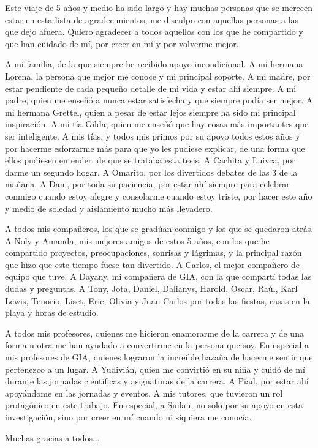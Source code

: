 \begin{acknowledgements}

Este viaje de 5 años y medio ha sido largo y hay muchas personas que se merecen estar en esta lista de agradecimientos, me disculpo con aquellas personas a las que dejo afuera. Quiero agradecer a todos aquellos con los que he compartido y que han cuidado de mí, por creer en mí y por volverme mejor.

A mi familia, de la que siempre he recibido apoyo incondicional. A mi hermana Lorena, la persona que mejor me conoce y mi principal soporte. A mi madre, por estar pendiente de cada pequeño detalle de mi vida y estar ahí siempre. A mi padre, quien me enseñó a nunca estar satisfecha y que siempre podía ser mejor. A mi hermana Grettel, quien a pesar de estar lejos siempre ha sido mi principal inspiración. A mi tía Gilda, quien me enseñó que hay cosas más importantes que ser inteligente. A mis tías, y todos mis primos por su apoyo todos estos años y por hacerme esforzarme más para que yo les pudiese explicar, de una forma que ellos pudiesen entender, de que se trataba esta tesis. A Cachita y Luivca, por darme un segundo hogar. A Omarito, por los divertidos debates de las 3 de la mañana. A Dani, por toda su paciencia, por estar ahí siempre para celebrar conmigo cuando estoy alegre y consolarme cuando estoy triste, por hacer este año y medio de soledad y aislamiento mucho más llevadero.%


A todos mis compañeros, los que se gradúan conmigo y los que se quedaron atrás. A Noly y Amanda, mis mejores amigos de estos 5 años, con los que he compartido proyectos, preocupaciones, sonrisas y lágrimas, y la principal razón que hizo que este tiempo fuese tan divertido. A Carlos, el mejor compañero de equipo que tuve. A Dayany, mi compañera de GIA, con la que compartí todas las dudas y preguntas. A Tony, Jota, Daniel, Dalianys, Harold, Oscar, Raúl, Karl Lewis, Tenorio, Liset, Eric, Olivia y Juan Carlos por todas las fiestas, casas en la playa y horas de estudio.

A todos mis profesores, quienes me hicieron enamorarme de la carrera y de una forma u otra me han ayudado a convertirme en la persona que soy. En especial a mis profesores de GIA, quienes lograron la increíble hazaña de hacerme sentir que pertenezco a un lugar. A Yudivián, quien me convirtió en su niña y cuidó de mí durante las jornadas científicas y asignaturas de la carrera. A Piad, por estar ahí apoyándome en las jornadas y eventos. A mis tutores, que tuvieron un rol protagónico en este trabajo. En especial, a Suilan, no solo por su apoyo en esta investigación, sino por creer en mí cuando ni siquiera me conocía. 


Muchas gracias a todos...

\end{acknowledgements}
